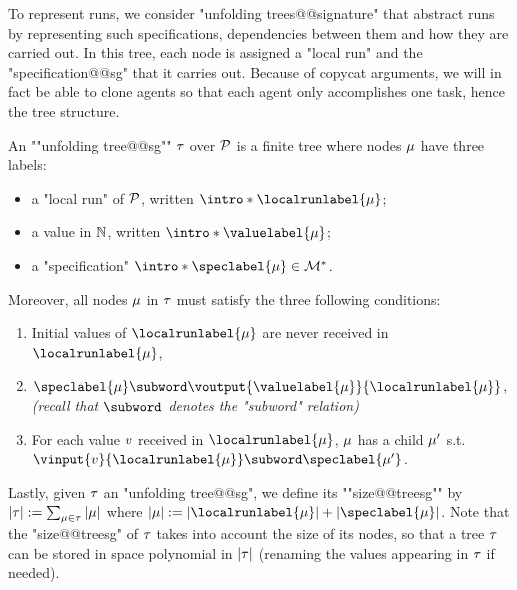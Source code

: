 To represent runs, we consider "unfolding trees@@signature" that abstract runs by representing such specifications, dependencies between them and how they are carried out. In this tree, each node is assigned a "local run" and the "specification@@sg" that it carries out. 
Because of copycat arguments, we will in fact be able to clone agents so that each agent only accomplishes one task, hence the tree structure.

\begin{definition}
\label{def:unfolding_tree_signature}
\AP An ""unfolding tree@@sg"" $\tau$ over $\mathcal{P}$ is
a finite tree where nodes $\mu$ have three labels:
\begin{itemize}
	\item a "local run" of $\mathcal{P}$, written $\intro*\localrunlabel{\node}$;
	
	\item a value in $\mathbb{N}$, written $\intro*\valuelabel{\node}$;
	
	\item a "specification" $\intro*\speclabel{\node} \in \messages^*$.
\end{itemize} 
Moreover, all nodes $\mu$ in $\tau$ must satisfy the three following conditions:
\begin{enumerate}[label= (\roman*), ref=(\roman*)]
	\item \label{item:condition1_initial_value_sg} Initial values of $\localrunlabel{\node}$ are never received in $\localrunlabel{\node}$,
	\item \label{item:condition3_boss_node_sg} $\speclabel{\node} \subword \voutput{\valuelabel{\node}}{\localrunlabel{\node}}$, \emph{(recall that $\subword$ denotes the "subword" relation)}
	\item \label{item:condition2_non_initial_value_sg} For each value $v$ received in $\localrunlabel{\node}$, $\mu$ has a child $\mu'$ s.t. $\vinput{\aval}{\localrunlabel{\node}} \subword \speclabel{\node'}$.
\end{enumerate}

\AP Lastly, given $\tau$ an "unfolding tree@@sg", we define its ""size@@treesg"" by $|\tau| := \sum_{\mu \in \tau} |\mu|$ where $\size{\node} := \size{\localrunlabel{\node}} + \size{\speclabel{\node}}$. Note that the "size@@treesg" of $\tau$ takes into account the size of its nodes, so that a tree $\tau$ can be stored in space polynomial in $|\tau|$ (renaming the values appearing in $\tau$ if needed). 
\end{definition}


